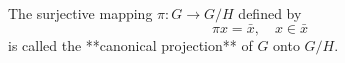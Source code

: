 The surjective mapping $\pi: G \to G/H$ defined by
$$\pi x = \bar{x}, \quad x \in \bar{x}$$
is called the **canonical projection** of $G$ onto $G/H$.
